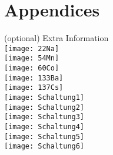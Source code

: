 \section{Appendices}
(optional) Extra Information
\\
\texttt{[image: 22Na]}
\\
\texttt{[image: 54Mn]}
\\
\texttt{[image: 60Co]}
\\
\texttt{[image: 133Ba]}
\\
\texttt{[image: 137Cs]}
\\
\texttt{[image: Schaltung1]}
\\
\texttt{[image: Schaltung2]}
\\
\texttt{[image: Schaltung3]}
\\
\texttt{[image: Schaltung4]}
\\
\texttt{[image: Schaltung5]}
\\
\texttt{[image: Schaltung6]}
\\
